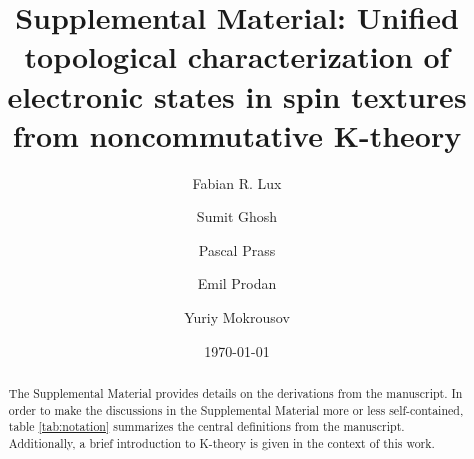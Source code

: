 \documentclass[
    aps,
    prb,
    twocolumn,
    floatfix,
    superscriptaddress,
	10pt
]{revtex4-2}
\begin{document}

\renewcommand{\arraystretch}{1.2}
\setcounter{secnumdepth}{2} 


\title{
	\texorpdfstring{
    Supplemental Material: Unified  topological characterization of electronic states in spin textures \\ from noncommutative K-theory
	}
	{
	Supplemental Material: Unified  topological characterization of electronic states in spin textures from noncommutative K-theory
	}
}

\author{Fabian R. Lux}
    \affiliation{\mainz}
	\affiliation{\nyc}

\author{Sumit Ghosh}
   \affiliation{\pgi} 
   
\author{Pascal Prass}
    \affiliation{\mainz}
    
\author{Emil Prodan}
    \affiliation{\nyc}
    
\author{Yuriy Mokrousov}
    \affiliation{\pgi}
    \affiliation{\mainz}

\date{\today}


\begin{abstract}
	The Supplemental Material provides details on the derivations from the manuscript. 
	In order to make the discussions in the Supplemental Material more or less self-contained, table \ref{tab:notation} summarizes the central definitions from the manuscript.
	Additionally, a brief introduction to K-theory is given in the context of this work.
\end{abstract}


\maketitle

\onecolumngrid


\tableofcontents

\clearpage
\end{document}
